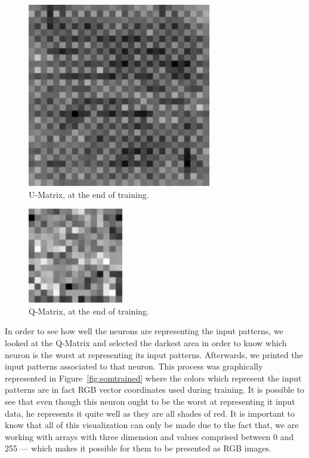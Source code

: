 \documentclass[journal]{IEEEtran}
\begin{document}
\begin{figure}[h!]
  \centering
  \includegraphics[width=0.4\linewidth]{./images/som_training/3_umatrix.pdf}
  \caption{U-Matrix, at the end of training.}
  \label{chp3:threematrix}
\end{figure}

\begin{figure}[h!]
  \centering
  \includegraphics[width=0.4\linewidth]{./images/som_training/3_quantmatrix.pdf}
  \caption{ Q-Matrix, at the end of training.}
  \label{chp3:threetopmat}
\end{figure}
 
In order to see how well the neurons are representing the input patterns, we looked at the \ac{Q-Matrix} and selected the darkest area in order to know which neuron is the worst at representing its input patterns. Afterwards, we printed the input patterns associated to that neuron. This process was graphically represented in Figure~\ref{fig:somtrained} where the colors which represent the input patterns are in fact RGB vector coordinates used during training. It is possible to see that even though this neuron ought to be the worst at representing it input data, he represents it quite well as they are all shades of red. 
It is important to know that all of this visualization can only be made due to the fact that, we are working with arrays with three dimension and values comprised between 0 and 255 --- which makes it possible for them to be presented as RGB images. 
\end{document}
